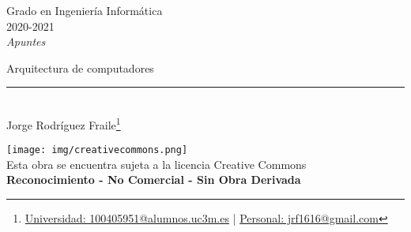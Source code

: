 \documentclass[12pt, twoside, openright]{report} %
\begin{document}

\begin{titlepage}
	\begin{sffamily}
		\color{azulUC3M}
		\begin{center}
			\begin{figure}[H] %
			\end{figure}
			\vspace{2.5cm}
			\begin{Large}
				Grado en Ingeniería Informática\\
				2020-2021\\
				\vspace{2cm}
				\textsl{Apuntes}\\
				\bigskip
			\end{Large}
			{\Huge Arquitectura de computadores}\\
			\vspace*{0.5cm}
			\rule{10.5cm}{0.1mm}\\
			\vspace*{0.9cm}
			{\LARGE Jorge Rodríguez Fraile\footnote{\href{mailto:100405951@alumnos.uc3m.es}{Universidad: 100405951@alumnos.uc3m.es}  |  \href{mailto:jrf1616@gmail.com}{Personal: jrf1616@gmail.com}}}\\
			\vspace*{1cm}
		\end{center}
		\vfill
		\color{black}
		\texttt{[image: img/creativecommons.png]}\\
		Esta obra se encuentra sujeta a la licencia Creative Commons\\ \textbf{Reconocimiento - No Comercial - Sin Obra Derivada}
	\end{sffamily}
\end{titlepage}


\tableofcontents
\thispagestyle{fancy}

\listoffigures
\thispagestyle{fancy}


\end{document}
